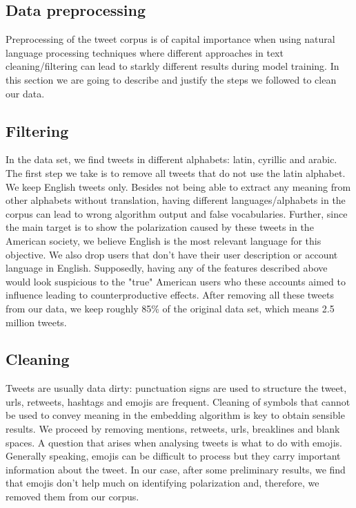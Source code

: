 \documentclass[12pt, authoryear]{elsarticle}
\begin{document}
\subsection{Data preprocessing}
    
Preprocessing of the tweet corpus is of capital importance when using natural language processing techniques where different approaches in text cleaning/filtering can lead to starkly different results during model training. In this section we are going to describe and justify the steps we followed to clean our data.
    
\subsection{Filtering}

In the data set, we find tweets in different alphabets: latin, cyrillic and arabic. The first step we take is to remove all tweets that do not use the latin alphabet. We keep English tweets only. Besides not being able to extract any meaning from other alphabets without translation, having different languages/alphabets in the corpus can lead to wrong algorithm output and false vocabularies. Further, since the main target is to show the polarization caused by these tweets in the American society, we believe English is the most relevant language for this objective. We also drop users that don't have their user description or account language in English. Supposedly, having any of the features described above would look suspicious to the "true" American users who these accounts aimed to influence leading to counterproductive effects. After removing all these tweets from our data, we keep roughly 85\% of the original data set, which means 2.5 million tweets.

\subsection{Cleaning}

Tweets are usually data dirty: punctuation signs are used to structure the tweet, urls, retweets, hashtags and emojis are frequent. Cleaning of symbols that cannot be used to convey meaning in the embedding algorithm is key to obtain sensible results. We proceed by removing mentions, retweets, urls, breaklines and  blank spaces. A question that arises when analysing tweets is what to do with emojis. Generally speaking, emojis can be difficult to process but they carry important information about the tweet. In our case, after some preliminary results, we find that emojis don't help much on identifying polarization and, therefore, we removed them from our corpus.
\end{document}
